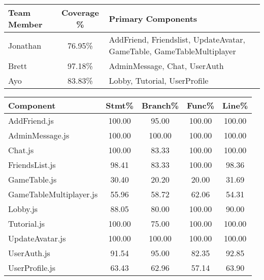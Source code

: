 \begin{minipage}{\textwidth}
\begin{center}
\vspace{1em}
\begin{tabular}{|l|c|p{6cm}|}
\hline
\textbf{Team Member} & \textbf{Coverage \%} & \textbf{Primary Components} \\
\hline
Jonathan & 76.95\% & AddFriend, Friendslist, UpdateAvatar, GameTable, GameTableMultiplayer \\
Brett & 97.18\% & AdminMessage, Chat, UserAuth \\
Ayo & 83.83\% & Lobby, Tutorial, UserProfile \\
\hline
\end{tabular}

\vspace{1em}
\small
\begin{tabular}{|l|c|c|c|c|}
\hline
\textbf{Component} & \textbf{Stmt\%} & \textbf{Branch\%} & \textbf{Func\%} & \textbf{Line\%} \\
\hline
AddFriend.js & 100.00 & 95.00 & 100.00 & 100.00 \\
AdminMessage.js & 100.00 & 100.00 & 100.00 & 100.00 \\
Chat.js & 100.00 & 83.33 & 100.00 & 100.00 \\
FriendsList.js & 98.41 & 83.33 & 100.00 & 98.36 \\
GameTable.js & 30.40 & 20.20 & 20.00 & 31.69 \\
GameTableMultiplayer.js & 55.96 & 58.72 & 62.06 & 54.31 \\
Lobby.js & 88.05 & 80.00 & 100.00 & 90.00 \\
Tutorial.js & 100.00 & 75.00 & 100.00 & 100.00 \\
UpdateAvatar.js & 100.00 & 100.00 & 100.00 & 100.00 \\
UserAuth.js & 91.54 & 95.00 & 82.35 & 92.85 \\
UserProfile.js & 63.43 & 62.96 & 57.14 & 63.90 \\
\hline
\end{tabular}
\end{center}
\end{minipage}
